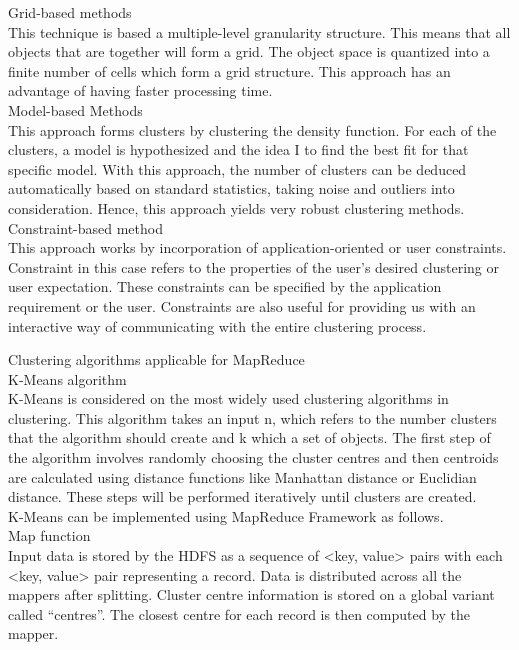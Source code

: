 \documentclass[conference]{IEEEtran}
\begin{document}
Grid-based methods \\
This technique is based a multiple-level granularity structure. This means that all objects that are together will form a grid.  The object space is quantized into a finite number of cells which form a grid structure. This approach has an advantage of having faster processing time.\\


Model-based Methods \\
This approach forms clusters by clustering the density function. For each of the clusters, a model is hypothesized and the idea I to find the best fit for that specific model. With this approach, the number of clusters can be deduced automatically based on standard statistics, taking noise and outliers into consideration. Hence, this approach yields very robust clustering methods. \\

Constraint-based method\\

This approach works by incorporation of application-oriented or user constraints. Constraint in this case refers to the properties of the user’s desired clustering or user expectation. These constraints can be specified by the application requirement or the user. Constraints are also useful for providing us with an interactive way of communicating with the entire clustering process.

Clustering algorithms applicable for MapReduce	\\

K-Means algorithm\\

K-Means is considered on the most widely used clustering algorithms in clustering. This algorithm takes an input n, which refers to the number clusters that the algorithm should create and k which a set of objects. The first step of the algorithm involves randomly choosing the cluster centres and then centroids are calculated using distance functions like Manhattan distance or Euclidian distance. These steps will be performed iteratively until clusters are created. \\

K-Means can be implemented using MapReduce Framework as follows.\\

Map function\\
Input data is stored by the HDFS as a sequence of <key, value> pairs with each <key, value> pair representing a record. Data is distributed across all the mappers after splitting. Cluster centre information is stored on a global variant called “centres”. The closest centre for each record is then computed by the mapper.\\
\end{document}
